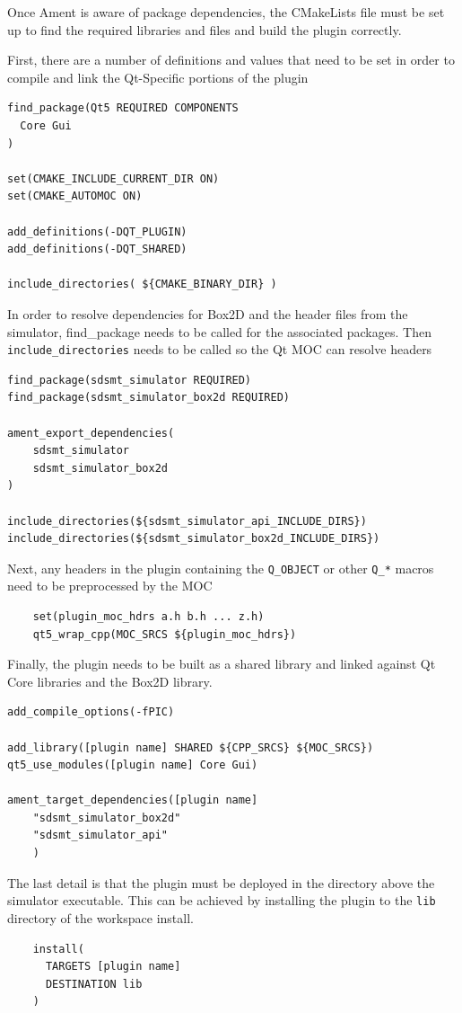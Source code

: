 \begin{itemize}
Once Ament is aware of package dependencies, the CMakeLists file must be set up to find the required libraries and files and build the plugin correctly.

First, there are a number of definitions and values that need to be set in order to compile and link the Qt-Specific portions of the plugin
\begin{lstlisting}
find_package(Qt5 REQUIRED COMPONENTS
  Core Gui
)

set(CMAKE_INCLUDE_CURRENT_DIR ON)
set(CMAKE_AUTOMOC ON)

add_definitions(-DQT_PLUGIN)
add_definitions(-DQT_SHARED)

include_directories( ${CMAKE_BINARY_DIR} )
\end{lstlisting}

In order to resolve dependencies for Box2D and the header files from the simulator, find\_package needs to be called for the associated packages. Then \lstinline|include_directories| needs to be called so the Qt MOC can resolve headers
\begin{lstlisting}
find_package(sdsmt_simulator REQUIRED)
find_package(sdsmt_simulator_box2d REQUIRED)
    
ament_export_dependencies(
    sdsmt_simulator
    sdsmt_simulator_box2d
)

include_directories(${sdsmt_simulator_api_INCLUDE_DIRS})
include_directories(${sdsmt_simulator_box2d_INCLUDE_DIRS})
\end{lstlisting}

Next, any headers in the plugin containing the \lstinline|Q_OBJECT| or other \lstinline|Q_*| macros need to be preprocessed by the MOC
\begin{lstlisting}
	set(plugin_moc_hdrs a.h b.h ... z.h)
    qt5_wrap_cpp(MOC_SRCS ${plugin_moc_hdrs})
\end{lstlisting}

Finally, the plugin needs to be built as a shared library and linked against Qt Core libraries and the Box2D library.
\begin{lstlisting}
add_compile_options(-fPIC)

add_library([plugin name] SHARED ${CPP_SRCS} ${MOC_SRCS})
qt5_use_modules([plugin name] Core Gui)

ament_target_dependencies([plugin name]
	"sdsmt_simulator_box2d"
	"sdsmt_simulator_api"
	)
\end{lstlisting}

The last detail is that the plugin must be deployed in the directory above the simulator executable. This can be achieved by installing the plugin to the \lstinline|lib| directory of the workspace install.
\begin{lstlisting}
    install(
      TARGETS [plugin name]
      DESTINATION lib
    )
\end{lstlisting}


\end{itemize}
